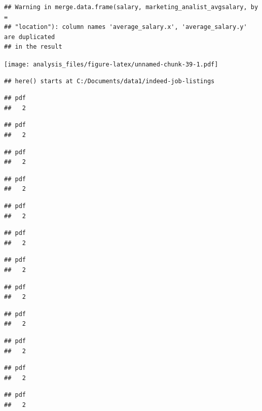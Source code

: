 \documentclass[
]{article}
\begin{document}
\begin{verbatim}
## Warning in merge.data.frame(salary, marketing_analist_avgsalary, by =
## "location"): column names 'average_salary.x', 'average_salary.y' are duplicated
## in the result
\end{verbatim}

\texttt{[image: analysis\_files/figure-latex/unnamed-chunk-39-1.pdf]}

\begin{verbatim}
## here() starts at C:/Documents/data1/indeed-job-listings
\end{verbatim}

\begin{verbatim}
## pdf 
##   2
\end{verbatim}

\begin{verbatim}
## pdf 
##   2
\end{verbatim}

\begin{verbatim}
## pdf 
##   2
\end{verbatim}

\begin{verbatim}
## pdf 
##   2
\end{verbatim}

\begin{verbatim}
## pdf 
##   2
\end{verbatim}

\begin{verbatim}
## pdf 
##   2
\end{verbatim}

\begin{verbatim}
## pdf 
##   2
\end{verbatim}

\begin{verbatim}
## pdf 
##   2
\end{verbatim}

\begin{verbatim}
## pdf 
##   2
\end{verbatim}

\begin{verbatim}
## pdf 
##   2
\end{verbatim}

\begin{verbatim}
## pdf 
##   2
\end{verbatim}

\begin{verbatim}
## pdf 
##   2
\end{verbatim}
\end{document}
